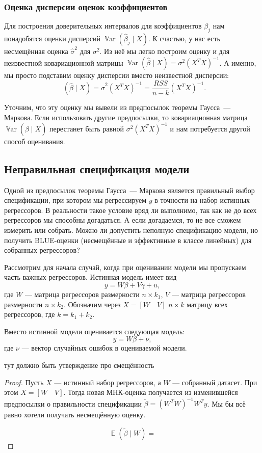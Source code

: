 \documentclass[12pt]{article}
\DeclareMathOperator{\Var}{\mathbb{V}ar}
\DeclareMathOperator{\hVar}{\widehat{\Var}}
\DeclareMathOperator{\E}{\mathbb{E}}
\renewcommand{\b}{\beta}
\newcommand{\hb}{\hat{\beta}}
\newcommand{\tb}{\tilde{\beta}}
\newcommand{\hs}{\hat{\sigma}}
\newcommand{\RSS}{RSS}
\begin{document}
\subsubsection*{Оценка дисперсии оценок коэффициентов}

Для построения доверительных интервалов для коэффициентов $\beta_j$ нам понадобятся оценки дисперсий $\Var(\hb_j \mid X)$.
К счастью, у нас есть несмещённая оценка $\hs^2$ для $\sigma^2$.
Из неё мы легко построим оценку и для неизвестной ковариационной матрицы $\Var(\hb \mid X) = \sigma^2 (X^T X)^{-1}$.
А именно, мы просто подставим оценку дисперсии вместо неизвестной дисперсии:
\[
\hVar(\hb \mid X) = \hs^2 (X^T X)^{-1} = \frac{\RSS}{n - k} (X^TX)^{-1}.
\]

Уточним, что эту оценку мы вывели из предпосылок теоремы Гаусса~— Маркова. 
Если использовать другие предпосылки, то ковариационная матрица $\Var(\hb \mid X)$ перестанет быть равной $\sigma^2 (X^TX)^{-1}$ и нам потребуется другой способ оценивания. 


\subsection{Неправильная спецификация модели}

Одной из предпосылок теоремы Гаусса~— Маркова является правильный выбор спецификации, при котором мы регрессируем $y$ в точности на набор истинных регрессоров. В реальности такое условие вряд ли выполнимо, так как не до всех регрессоров мы способны догадаться. А если догадаемся, то не все сможем измерить или собрать. Можно ли допустить неполную спецификацию модели, но получить BLUE-оценки (несмещённые и эффективные в классе линейных) для собранных регрессоров?

Рассмотрим для начала случай, когда при оценивании модели мы пропускаем часть важных регрессоров. Истинная модель имеет вид
\[
y = W\b + V\gamma + u,
\]
где $W$ — матрица регрессоров размерности $n \times k_1$, $V$ — матрица регрессоров размерности $n \times k_2$. Обозначим через $X = [W \quad V]$ $n \times k$ матрицу всех регрессоров, где $k = k_1 + k_2$.

Вместо истинной модели оценивается следующая модель:
\[
y = W\b + \nu,
\]
где $\nu$ — вектор случайных ошибок в оцениваемой модели.

\begin{lemma}
тут должно быть утверждение про смещённость 
\end{lemma}

\begin{proof}
Пусть $X$ — истинный набор регрессоров, а $W$ — собранный датасет. 
При этом $X = [W \quad V]$. Тогда новая МНК-оценка получается из изменившейся предпосылки о правильности спецификации $\tb = (W^T W)^{-1}W^T y$. Мы бы всё равно хотели получать несмещённую оценку.

\[ \E(\tb \mid W) =  \]

\end{proof}
\end{document}

